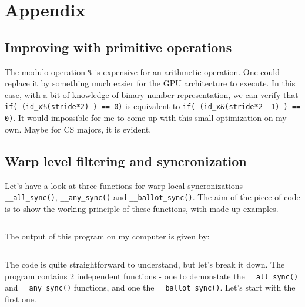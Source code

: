 \section{Appendix}
\subsection*{Improving with primitive operations}\label{App.:Primitive operations}
The modulo operation \verb|%| is expensive for an arithmetic operation. One could replace it 
by something much easier for the GPU architecture to execute. In this case, with a bit of 
knowledge of binary number representation, we can verify that \verb|if( (id_x%(stride*2) ) == 0)| is 
equivalent to \verb|if( (id_x&(stride*2 -1) ) == 0)|. It would impossible for me to come up with this small 
optimization on my own. Maybe for CS majors, it is evident.

\subsection*{Warp level filtering and syncronization}
Let's have a look at three functions for warp-local syncronizations - \verb|__all_sync()|, \verb|__any_sync()| and \verb|__ballot_sync()|.
The aim of the piece of code is to show the working principle of these functions, with made-up examples.
\begin{code}
\inputminted[frame=single, framesep=1mm, breaklines, linenos=true]{cuda}{cucodes/all_any_sync.cu}

\label{app:all_any_ballot}
\end{code}

The output of this program on my computer is given by: 
\begin{code}
\inputminted[breaklines, frame=single, tabsize=1]{zsh}{cucodes/output_all_any.sh}
\end{code}
The code is quite straightforward to understand, but let's break it down. The program contains 
2 independent functions - one to demonstate the \verb|__all_sync()| and \verb|__any_sync()| functions, 
and one the \verb|__ballot_sync()|. Let's start with the first one.


